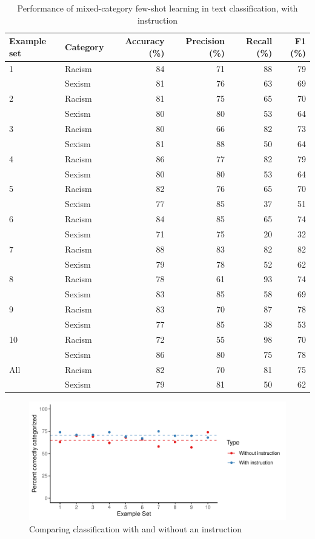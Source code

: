 \documentclass[12pt,]{article}
\begin{document}
\begin{table}

\caption{\label{tab:fewshotmixedinstruct-summary}Performance of mixed-category few-shot learning in text classification, with instruction}
\centering
\begin{tabular}[t]{llrrrr}
\toprule
Example set & Category & Accuracy (\%) & Precision (\%) & Recall (\%) & F1 (\%)\\
\midrule
1 & Racism & 84 & 71 & 88 & 79\\
 & Sexism & 81 & 76 & 63 & 69\\
\midrule
2 & Racism & 81 & 75 & 65 & 70\\
 & Sexism & 80 & 80 & 53 & \vphantom{1} 64\\
\midrule
3 & Racism & 80 & 66 & 82 & 73\\
 & Sexism & 81 & 88 & 50 & 64\\
\midrule
4 & Racism & 86 & 77 & 82 & 79\\
 & Sexism & 80 & 80 & 53 & 64\\
\midrule
5 & Racism & 82 & 76 & 65 & 70\\
 & Sexism & 77 & 85 & 37 & 51\\
\midrule
6 & Racism & 84 & 85 & 65 & 74\\
 & Sexism & 71 & 75 & 20 & 32\\
\midrule
7 & Racism & 88 & 83 & 82 & 82\\
 & Sexism & 79 & 78 & 52 & 62\\
\midrule
8 & Racism & 78 & 61 & 93 & 74\\
 & Sexism & 83 & 85 & 58 & 69\\
\midrule
9 & Racism & 83 & 70 & 87 & 78\\
 & Sexism & 77 & 85 & 38 & 53\\
\midrule
10 & Racism & 72 & 55 & 98 & 70\\
 & Sexism & 86 & 80 & 75 & 78\\
\midrule
All & Racism & 82 & 70 & 81 & 75\\
 & Sexism & 79 & 81 & 50 & 62\\
\bottomrule
\end{tabular}
\end{table}

\begin{figure}
\centering
\includegraphics{paper_files/figure-latex/comparison-1.pdf}
\caption{\label{fig:comparison}Comparing classification with and without an instruction}
\end{figure}
\end{document}
